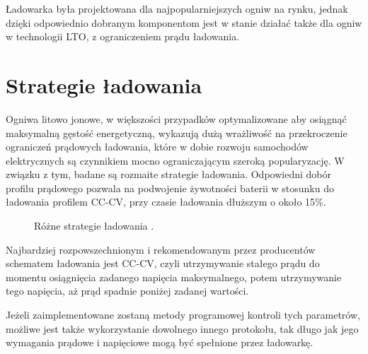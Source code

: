 \documentclass[polish,engineer]{polsl-msth}
\begin{document}
Ładowarka była projektowana dla najpopularniejszych ogniw na rynku, jednak dzięki odpowiednio dobranym komponentom jest w stanie działać także dla ogniw w technologii LTO, z ograniczeniem prądu ładowania.

\section{Strategie ładowania}
Ogniwa litowo jonowe, w większości przypadków optymalizowane aby osiągnąć maksymalną gęstość energetyczną, wykazują dużą wrażliwość na przekroczenie ograniczeń prądowych ładowania\cite{TOMASZEWSKA2019100011}, które w dobie rozwoju samochodów elektrycznych są czynnikiem mocno ograniczającym szeroką popularyzację. W związku z tym, badane są rozmaite strategie ładowania. Odpowiedni dobór profilu prądowego pozwala na podwojenie żywotności baterii w stosunku do ładowania profilem CC-CV, przy czasie ładowania dłuższym o około 15\%\cite{SCHINDLER2018364}.
\begin{figure}[hbtp]
     \caption{Różne strategie ładowania \cite{TOMASZEWSKA2019100011}.\label{img:charging_protocols}}
\end{figure}

Najbardziej rozpowszechnionym i rekomendowanym przez producentów schematem ładowania jest CC-CV, czyli utrzymywanie stałego prądu do momentu osiągnięcia zadanego napięcia maksymalnego, potem utrzymywanie tego napięcia, aż prąd spadnie poniżej zadanej wartości.

Jeżeli zaimplementowane zostaną metody programowej kontroli tych parametrów, możliwe jest także wykorzystanie dowolnego innego protokołu, tak długo jak jego wymagania prądowe i napięciowe mogą być spełnione przez ładowarkę.
\end{document}
